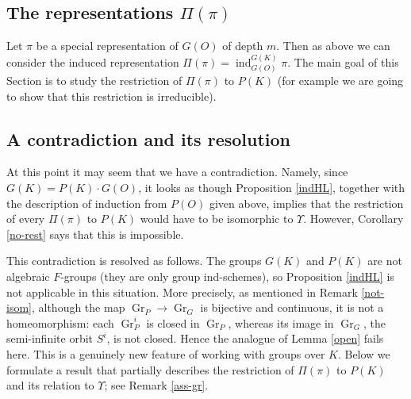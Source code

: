 \documentclass[11pt,a4paper,twoside]{amsart}
\theoremstyle{definition}
\theoremstyle{remark}
\newcommand{\ind}{\operatorname{ind}}
\newcommand{\Gr}{\operatorname{Gr}}
\begin{document}
\subsection{The representations $\Pi(\pi)$} Let $\pi$ be a special representation of $G(O)$ of depth $m$. Then as above we can consider the induced representation $\Pi(\pi)=\ind_{G(O)}^{G(K)}\pi$. The main goal of this Section is to study the restriction of $\Pi(\pi)$ to $P(K)$ (for example we are going to show that this restriction is irreducible).

\subsection{A contradiction and its resolution} At this point it may seem that we have a contradiction. Namely, since
$G(K)=P(K)\cdot G(O)$, it looks as though Proposition \ref{indHL}, together with the description of induction from $P(O)$ given above, implies that the restriction of every $\Pi(\pi)$ to $P(K)$ would have to be isomorphic to $\Upsilon$. However, Corollary \ref{no-rest} says that this is impossible.

This contradiction is resolved as follows. The groups $G(K)$ and $P(K)$ are not algebraic $F$-groups (they are only group ind-schemes), so Proposition \ref{indHL} is not applicable in this situation. More precisely, as mentioned in Remark \ref{not-isom}, although the map $\Gr_P\to \Gr_G$ is bijective and continuous, it is not a homeomorphism: each $\Gr_P^i$ is closed in $\Gr_P$, whereas its image in $\Gr_G$, the semi-infinite orbit $S^i$, is not closed. Hence the analogue of Lemma \ref{open} fails here. This is a genuinely new feature of working with groups over $K$. Below we formulate a result that partially describes the restriction of $\Pi(\pi)$ to $P(K)$ and its relation to $\Upsilon$; see Remark \ref{ass-gr}.
\end{document}
